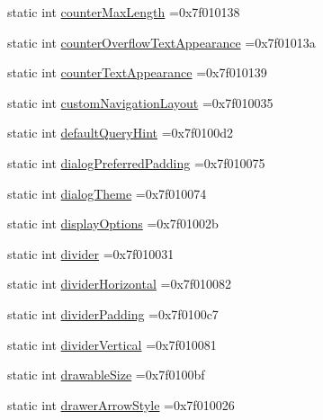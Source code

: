 \begin{DoxyCompactItemize}
\item 
static int \hyperlink{classandroid_1_1support_1_1v7_1_1mediarouter_1_1R_1_1attr_aef123b7d5dda75ae66b80093cc4058b8}{counter\+Max\+Length} =0x7f010138
\item 
static int \hyperlink{classandroid_1_1support_1_1v7_1_1mediarouter_1_1R_1_1attr_aa04cf2f0df85f42d9d16c4f0c35e3f3d}{counter\+Overflow\+Text\+Appearance} =0x7f01013a
\item 
static int \hyperlink{classandroid_1_1support_1_1v7_1_1mediarouter_1_1R_1_1attr_ae2781dd8f0eed4b5270ab26c4e25229c}{counter\+Text\+Appearance} =0x7f010139
\item 
static int \hyperlink{classandroid_1_1support_1_1v7_1_1mediarouter_1_1R_1_1attr_a3b3733a1976437f986f9b8cc4c34a6a5}{custom\+Navigation\+Layout} =0x7f010035
\item 
static int \hyperlink{classandroid_1_1support_1_1v7_1_1mediarouter_1_1R_1_1attr_ad68760a1fd767d292c3eb3ea720e2ecc}{default\+Query\+Hint} =0x7f0100d2
\item 
static int \hyperlink{classandroid_1_1support_1_1v7_1_1mediarouter_1_1R_1_1attr_adafd11447e4528712df28c762b51f02d}{dialog\+Preferred\+Padding} =0x7f010075
\item 
static int \hyperlink{classandroid_1_1support_1_1v7_1_1mediarouter_1_1R_1_1attr_a2f9840e6a4c028c1cad08bae7f0ee960}{dialog\+Theme} =0x7f010074
\item 
static int \hyperlink{classandroid_1_1support_1_1v7_1_1mediarouter_1_1R_1_1attr_aa8901ce272bac5ae82af0d8a34f9ae05}{display\+Options} =0x7f01002b
\item 
static int \hyperlink{classandroid_1_1support_1_1v7_1_1mediarouter_1_1R_1_1attr_a8be8d169a154b716f3840650590a48f2}{divider} =0x7f010031
\item 
static int \hyperlink{classandroid_1_1support_1_1v7_1_1mediarouter_1_1R_1_1attr_ab722068c962f9a2b375b02825173ff58}{divider\+Horizontal} =0x7f010082
\item 
static int \hyperlink{classandroid_1_1support_1_1v7_1_1mediarouter_1_1R_1_1attr_a1211ba7f3739936f900811426f3f70d9}{divider\+Padding} =0x7f0100c7
\item 
static int \hyperlink{classandroid_1_1support_1_1v7_1_1mediarouter_1_1R_1_1attr_a682a495d66b60b4085b3e2eb570f2f79}{divider\+Vertical} =0x7f010081
\item 
static int \hyperlink{classandroid_1_1support_1_1v7_1_1mediarouter_1_1R_1_1attr_a757642cadfbbf0eb88e795794f658959}{drawable\+Size} =0x7f0100bf
\item 
static int \hyperlink{classandroid_1_1support_1_1v7_1_1mediarouter_1_1R_1_1attr_a7833ce16dc78ae79182bb9a4d850d811}{drawer\+Arrow\+Style} =0x7f010026

\end{DoxyCompactItemize}
